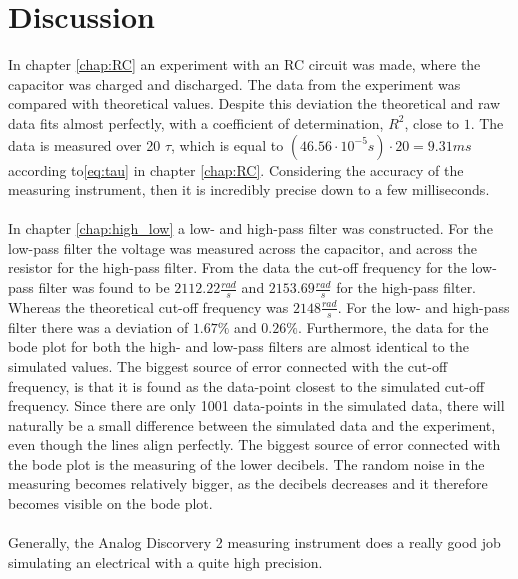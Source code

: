 \chapter{Discussion}
In chapter \ref{chap:RC} an experiment with an RC circuit was made, where the capacitor was charged and discharged. The data from the experiment was compared with theoretical values. Despite this deviation the theoretical and raw data fits almost perfectly, with a coefficient of determination, $R^2$, close to $1$. The data is measured over 20 $\tau$, which is equal to $\left(46.56 \cdot 10^{-5}s \right) \cdot 20 = 9.31 ms$ according to\eqref{eq:tau} in chapter \ref{chap:RC}. Considering the accuracy of the measuring instrument, then it is incredibly precise down to a few milliseconds. 
\\ \\
In chapter \ref{chap:high_low} a low- and high-pass filter was constructed. For the low-pass filter the voltage was measured across the capacitor, and across the resistor for the high-pass filter. From the data the cut-off frequency for the low-pass filter was found to be $2112.22 \frac{rad}{s}$ and $2153.69 \frac{rad}{s}$ for the high-pass filter. Whereas the theoretical cut-off frequency was $2148 \frac{rad}{s}$. For the low- and high-pass filter there was a deviation of $1.67 \% $ and $0.26 \% $. Furthermore, the data for the bode plot for both the high- and low-pass filters are almost identical to the simulated values. The biggest source of error connected with the cut-off frequency, is that it is found as the data-point closest to the simulated cut-off frequency. Since there are only 1001 data-points in the simulated data, there will naturally be a small difference between the simulated data and the experiment, even though the lines align perfectly. The biggest source of error connected with the bode plot is the measuring of the lower decibels. The random noise in the measuring becomes relatively bigger, as the decibels decreases and it therefore becomes visible on the bode plot.
\\ \\
Generally, the Analog Discorvery 2 measuring instrument does a really good job simulating an electrical with a quite high precision. 